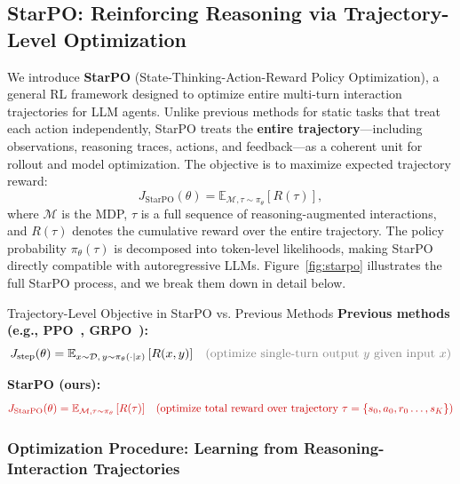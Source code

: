\subsection{StarPO: Reinforcing Reasoning via Trajectory-Level Optimization}

We introduce \textbf{StarPO} (State-Thinking-Action-Reward Policy Optimization), a general RL framework designed to optimize entire multi-turn interaction trajectories for LLM agents. Unlike previous methods for static tasks that treat each action independently, StarPO treats the \textbf{entire trajectory}—including observations, reasoning traces, actions, and feedback—as a coherent unit for rollout and model optimization.
The objective is to maximize expected trajectory reward:
\begin{equation}
    J_{\text{StarPO}}(\theta) = \mathbb{E}_{\mathcal{M}, \tau \sim \pi_{\theta}} \left[R(\tau) \right],
\end{equation}
where $\mathcal{M}$ is the MDP, $\tau$ is a full sequence of reasoning-augmented interactions, and $R(\tau)$ denotes the cumulative reward over the entire trajectory. The policy probability $\pi_\theta(\tau)$ is decomposed into token-level likelihoods, making StarPO directly compatible with autoregressive LLMs. Figure~\ref{fig:starpo} illustrates the full StarPO process, and we break them down in detail below.

\begin{onebox}{Trajectory-Level Objective in StarPO vs. Previous Methods}
\textbf{Previous methods (e.g., PPO~\citep{schulman2017proximalpolicyoptimizationalgorithms}, GRPO~\citep{shao2024deepseekmathpushinglimitsmathematical}):}
\[
\textcolor{black}{
J_{\text{step}}(\theta) = \mathbb{E}_{x \sim \mathcal{D},\, y \sim \pi_\theta(\cdot|x)}\left[ R(x, y) \right]
}
\quad
\textcolor{gray}{
\text{(optimize single-turn output } y \text{ given input } x)
}
\]

\textbf{StarPO (ours):}
\[
\textcolor{red!80!black}{
J_{\text{StarPO}}(\theta) = \mathbb{E}_{\mathcal{M}, \tau \sim \pi_\theta}\left[ R(\tau) \right]
}
\quad
\textcolor{red!80!black}{
\text{(optimize total reward over trajectory } \tau = \{s_0, a_0, r_0\dots, s_K\})
}
\]
\end{onebox}


\subsubsection{Optimization Procedure: Learning from Reasoning-Interaction Trajectories}

